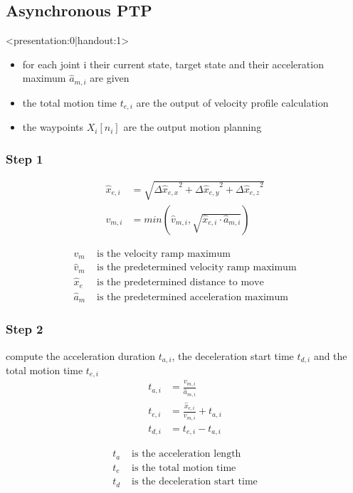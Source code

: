 \documentclass[%
  professionalfonts,%
  xcolor={%
    usenames,%
    dvipsnames,%
    svgnames,%
    table,%
    hyperref%
  }%
]{beamer}
\begin{document}
\subsection{Asynchronous PTP}
\begin{frame}<presentation:0|handout:1>
\begin{itemize}
\item for each joint i their current state, target state and their acceleration maximum $\hat{a}_{m,i}$ are given
\item the total motion time $t_{e,i}$ are the output of velocity profile calculation
\item the waypoints $X_{i}[n_{i}]$ are the output motion planning
\end{itemize}
\end{frame}

\subsubsection{Step 1}
\begin{frame}
\begin{align*}
\hat{x}_{e,i} & = \sqrt{{\Delta\hat{x}_{e,x}}^{2} + {\Delta\hat{x}_{e,y}}^{2} + {\Delta\hat{x}_{e,z}}^{2} } \\
v_{m,i } & = min(\hat{v}_{m,i},\sqrt{\hat{x}_{e,i} \cdot \hat{a}_{m,i}})  \label{eq:asynvmi}
\end{align*}

\begin{align*}
v_{m} & \text{ is the velocity ramp maximum} \\
\hat{v}_{m} & \text{ is the predetermined velocity ramp maximum} \\
\hat{x}_{e} & \text{ is the predetermined distance to move} \\
\hat{a}_{m} & \text{ is the predetermined acceleration maximum} 
\end{align*}
\end{frame}

\subsubsection{Step 2}
\begin{frame}
compute the acceleration duration $t_{a,i}$, the deceleration start time $t_{d,i}$ and the total motion time $t_{e,i}$
\begin{align*}
t_{a,i} & = \frac{v_{m,i}}{\hat{a}_{m,i}} \\
t_{e,i} & = \frac{\hat{x}_{e,i}}{v_{m,i}} + t_{a,i} \\
t_{d,i} & = t_{e,i} - t_{a,i}
\end{align*}

\begin{align*}
t_{a} & \text{ is the acceleration length} \\
t_{e} & \text{ is the total motion time} \\
t_{d} & \text{ is the deceleration start time}
\end{align*}
\end{frame}
  
\end{document}
